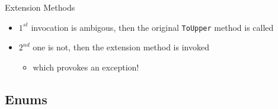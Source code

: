 \documentclass[presentation]{beamer}
\begin{document}
\begin{frame}[allowframebreaks]{Extension Methods}
  \begin{itemize}
    \item $1^{st}$ invocation is ambigous, then the original \texttt{ToUpper} method is called
    \item $2^{nd}$ one is not, then the extension method is invoked
    \begin{itemize}
      \item which provokes an exception!
    \end{itemize}
  \end{itemize}

\end{frame}

\subsection{Enums}
\end{document}
